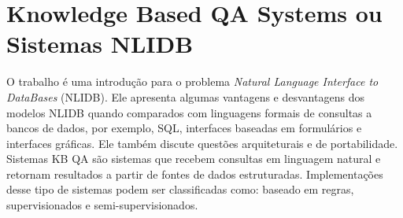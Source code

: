\documentclass{article}
\begin{document}








\section{Knowledge Based QA Systems ou Sistemas NLIDB\label{sistemasKB}}

O trabalho \citep{androutsopoulos1995natural} é uma introdução para o problema \textit{Natural Language Interface to DataBases} (NLIDB). Ele apresenta algumas vantagens e desvantagens dos modelos NLIDB quando comparados com linguagens formais de consultas a bancos de dados, por exemplo, SQL, interfaces baseadas em formulários e interfaces gráficas. Ele também discute questões arquiteturais e de portabilidade. \\

Sistemas KB QA são sistemas que recebem consultas em linguagem natural e retornam resultados a partir de fontes de dados estruturadas. Implementações desse tipo de sistemas podem ser classificadas como: baseado em regras, supervisionados e semi-supervisionados\citep{speech}.\\
\end{document}
